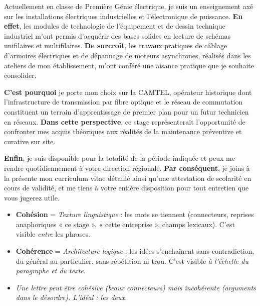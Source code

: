 \documentclass[11pt]{article}
\begin{document}
\begin{exemplebox}
Actuellement en classe de Première Génie électrique, je suis un enseignement axé sur les installations électriques industrielles et l'électronique de puissance. \textbf{En effet}, les modules de technologie de l'équipement et de dessin technique industriel m'ont permis d'acquérir des bases solides en lecture de schémas unifilaires et multifilaires. \textbf{De surcroît}, les travaux pratiques de câblage d'armoires électriques et de dépannage de moteurs asynchrones, réalisés dans les ateliers de mon établissement, m'ont conféré une aisance pratique que je souhaite consolider.

\textbf{C'est pourquoi} je porte mon choix sur la CAMTEL, opérateur historique dont l'infrastructure de transmission par fibre optique et le réseau de commutation constituent un terrain d'apprentissage de premier plan pour un futur technicien en réseaux. \textbf{Dans cette perspective}, ce stage représenterait l'opportunité de confronter mes acquis théoriques aux réalités de la maintenance préventive et curative sur site.

\textbf{Enfin}, je suis disponible pour la totalité de la période indiquée et peux me rendre quotidiennement à votre direction régionale. \textbf{Par conséquent}, je joins à la présente mon curriculum vitae détaillé ainsi qu'une attestation de scolarité en cours de validité, et me tiens à votre entière disposition pour tout entretien que vous jugerez utile.
\end{exemplebox}

\begin{attention}
\begin{itemize}
\item \textbf{Cohésion} = \textit{Texture linguistique} : les mots se tiennent (connecteurs, reprises anaphoriques « ce stage », « cette entreprise », champs lexicaux). C'est visible \textit{entre} les phrases.
\item \textbf{Cohérence} = \textit{Architecture logique} : les idées s'enchaînent sans contradiction, du général au particulier, sans répétition ni trou. C'est visible \textit{à l'échelle du paragraphe et du texte}.
\item \textit{Une lettre peut être cohésive (beaux connecteurs) mais incohérente (arguments dans le désordre). L'idéal : les deux.}
\end{itemize}
\end{attention}
\end{document}
